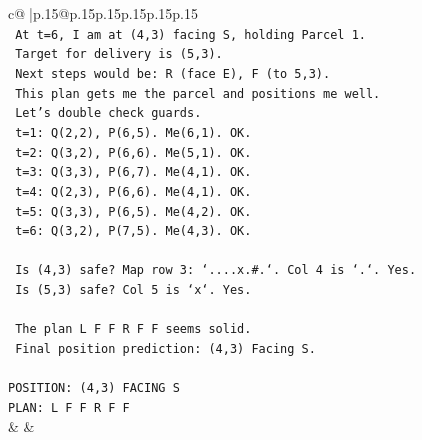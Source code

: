 \documentclass{article}
\begin{document}
{\begin{supertabular}{c@{$\;$}|p{.15\linewidth}@{}p{.15\linewidth}p{.15\linewidth}p{.15\linewidth}p{.15\linewidth}p{.15\linewidth}}
{{{\\ 
\texttt{   At t=6, I am at (4,3) facing S, holding Parcel 1.} \\
\texttt{   Target for delivery is (5,3).} \\
\texttt{   Next steps would be: R (face E), F (to 5,3).} \\
\texttt{   This plan gets me the parcel and positions me well.} \\
\texttt{   Let's double check guards.} \\
\texttt{   t=1: Q(2,2), P(6,5). Me(6,1). OK.} \\
\texttt{   t=2: Q(3,2), P(6,6). Me(5,1). OK.} \\
\texttt{   t=3: Q(3,3), P(6,7). Me(4,1). OK.} \\
\texttt{   t=4: Q(2,3), P(6,6). Me(4,1). OK.} \\
\texttt{   t=5: Q(3,3), P(6,5). Me(4,2). OK.} \\
\texttt{   t=6: Q(3,2), P(7,5). Me(4,3). OK.} \\
\\ 
\texttt{   Is (4,3) safe? Map row 3: `....x.\#.`. Col 4 is `.`. Yes.} \\
\texttt{   Is (5,3) safe? Col 5 is `x`. Yes.} \\
\\ 
\texttt{   The plan L F F R F F seems solid.} \\
\texttt{   Final position prediction: (4,3) Facing S.} \\
\\ 
\texttt{POSITION: (4,3) FACING S} \\
\texttt{PLAN: L F F R F F} \\
            }
        }
    }
    & & \\ \\


\end{supertabular}}
\end{document}
